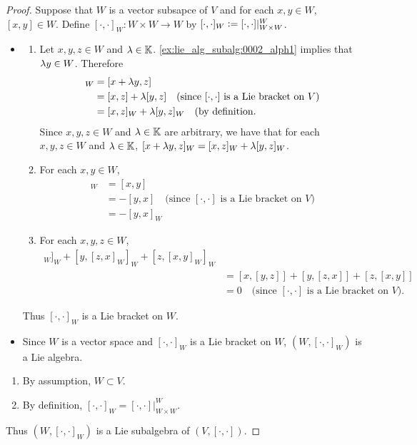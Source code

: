 \documentclass{book}
\begin{document}
\begin{proof}
	Suppose that $W$ is a vector subsapce of $V$ and for each $x, y \in W$, $[x, y] \in W$. Define $[\cdot, \cdot]_W: W \times W \rightarrow W$ by $[\cdot, \cdot]_W \vcentcolon= [\cdot, \cdot]|_{W \times W}^W$. 
	\begin{itemize}
		\item 
		\begin{enumerate}
			\item {} Let $x,y,z \in W$ and $\lambda \in \mathbb{K}$. \ref{ex:lie_alg_subalg:0002_alph1} implies that $\lambda y \in W$. Therefore
			\begin{align*}
				[x+ \lam y, z]_W 
				& = [x+ \lam y, z] \\
				& = [x, z] + \lam [y, z] \quad \text{(since $[\cdot, \cdot]$ is a Lie bracket on $V$)} \\
				& = [x, z]_W + \lam [y, z]_W \quad \text{(by definition}. 
			\end{align*}
			Since $x,y,z \in W$ and $\lambda \in \mathbb{K}$ are arbitrary, we have that for each $x,y,z \in W$ and $\lambda \in \mathbb{K}$, $[x+ \lambda y, z]_W = [x, z]_W + \lambda [y, z]_W$. 
			\item {} For each $x,y \in W$,
			\begin{align*}
				[x,y]_W 
				& = [x,y] \\
				& = -[y,x] \quad \text{(since $[\cdot, \cdot]$ is a Lie bracket on $V$)} \\
				& = -[y,x]_W 
			\end{align*}
			\item {} For each $x,y, z \in W$,
			\begin{align*}
				[x, [y,z]_W]_W + [y, [z,x]_W]_W + [z, [x,y]_W]_W \\
				& = [x, [y,z]] + [y, [z,x]] + [z, [x,y]] \\
				& = 0 \quad \text{(since $[\cdot, \cdot]$ is a Lie bracket on $V$)}.
			\end{align*}
		\end{enumerate}
		Thus $[\cdot, \cdot]_W$ is a Lie bracket on $W$.
		\item Since $W$ is a vector space and $[\cdot, \cdot]_W$ is a Lie bracket on $W$, $(W, [\cdot, \cdot]_W)$ is a Lie algebra. 
	\end{itemize}
	\begin{enumerate}
		\item By assumption, $W \subset V$. 
		\item By definition, $[\cdot, \cdot]_W = [\cdot, \cdot]|_{W \times W}^W$.
	\end{enumerate}
	Thus $(W, [\cdot, \cdot]_W)$ is a Lie subalgebra of $(V, [\cdot, \cdot])$.
\end{proof}
\end{document}
